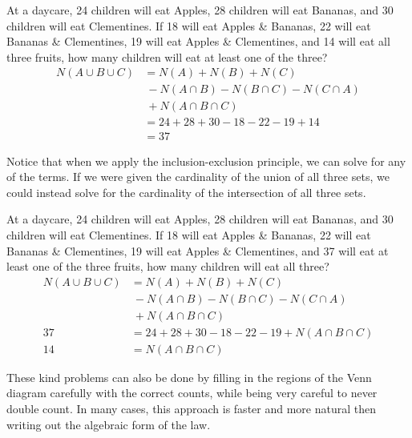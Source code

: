 \begin{example}
At a daycare, 24 children will eat Apples, 28 children will eat Bananas, and 30 children will eat Clementines. If 18 will eat Apples \& Bananas, 22 will eat Bananas \& Clementines, 19 will eat Apples \& Clementines, and 14 will eat all three fruits, how many children will eat at least one of the three?
$$\begin{aligned}
N(A \cup B \cup C) &= N(A) + N(B) + N(C)\\ &\  - N(A \cap B) - N(B \cap C) - N(C \cap A) \\ & \ + N(A \cap B \cap C) \\
&= 24 + 28 + 30 - 18 - 22 - 19 + 14 \\
&= 37
\end{aligned}$$
\end{example}

Notice that when we apply the inclusion-exclusion principle, we can solve for any of the terms. If we were given the cardinality of the union of all three sets, we could instead solve for the cardinality of the intersection of all three sets.

\begin{example}
At a daycare, 24 children will eat Apples, 28 children will eat Bananas, and 30 children will eat Clementines. If 18 will eat Apples \& Bananas, 22 will eat Bananas \& Clementines, 19 will eat Apples \& Clementines, and 37 will eat at least one of the three fruits, how many children will eat all three?
$$\begin{aligned}
N(A \cup B \cup C) &= N(A) + N(B) + N(C)\\ &\  - N(A \cap B) - N(B \cap C) - N(C \cap A) \\ & \ + N(A \cap B \cap C) \\
37 &= 24 + 28 + 30 - 18 - 22 - 19 + N(A \cap B \cap C) \\
14 &= N(A \cap B \cap C)
\end{aligned}$$
\end{example}

These kind problems can also be done by filling in the regions of the Venn diagram carefully with the correct counts, while being very careful to never double count. In many cases, this approach is faster and more natural then writing out the algebraic form of the law.

